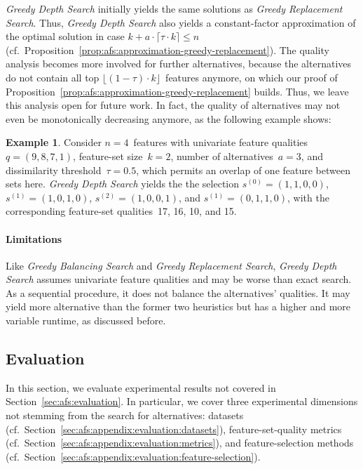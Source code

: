 \documentclass{article}
\theoremstyle{definition}
\newtheorem{example}{Example}
\begin{document}
\emph{Greedy Depth Search} initially yields the same solutions as \emph{Greedy Replacement Search}.
Thus, \emph{Greedy Depth Search} also yields a constant-factor approximation of the optimal solution in case $k + a \cdot \lceil \tau \cdot k \rceil \leq n$ (cf.~Proposition~\ref{prop:afs:approximation-greedy-replacement}).
The quality analysis becomes more involved for further alternatives, because the alternatives do not contain all top $\lfloor (1 - \tau) \cdot k \rfloor$~features anymore, on which our proof of Proposition~\ref{prop:afs:approximation-greedy-replacement} builds.
Thus, we leave this analysis open for future work.
In fact, the quality of alternatives may not even be monotonically decreasing anymore, as the following example shows:
%
\begin{example}
	Consider $n=4$~features with univariate feature qualities $q = (9,8,7,1)$, feature-set size~$k=2$, number of alternatives~$a=3$, and dissimilarity threshold~$\tau = 0.5$, which permits an overlap of one feature between sets here.
	\emph{Greedy Depth Search} yields the the selection $s^{(0)} = (1,1,0,0)$, $s^{(1)} = (1,0,1,0)$, $s^{(2)} = (1,0,0,1)$, and $s^{(1)} = (0,1,1,0)$, with the corresponding feature-set qualities~17, 16, 10, and 15.
	\label{ex:afs:greedy-depth:non-monotonic}
\end{example}

\paragraph{Limitations}

Like \emph{Greedy Balancing Search} and \emph{Greedy Replacement Search}, \emph{Greedy Depth Search} assumes univariate feature qualities and may be worse than exact search.
As a sequential procedure, it does not balance the alternatives' qualities.
It may yield more alternative than the former two heuristics but has a higher and more variable runtime, as discussed before.

\subsection{Evaluation}
\label{sec:afs:appendix:evaluation}

In this section, we evaluate experimental results not covered in Section~\ref{sec:afs:evaluation}.
In particular, we cover three experimental dimensions not stemming from the search for alternatives:
datasets (cf.~Section~\ref{sec:afs:appendix:evaluation:datasets}), feature-set-quality metrics (cf.~Section~\ref{sec:afs:appendix:evaluation:metrics}), and feature-selection methods (cf.~Section~\ref{sec:afs:appendix:evaluation:feature-selection}).
\end{document}
